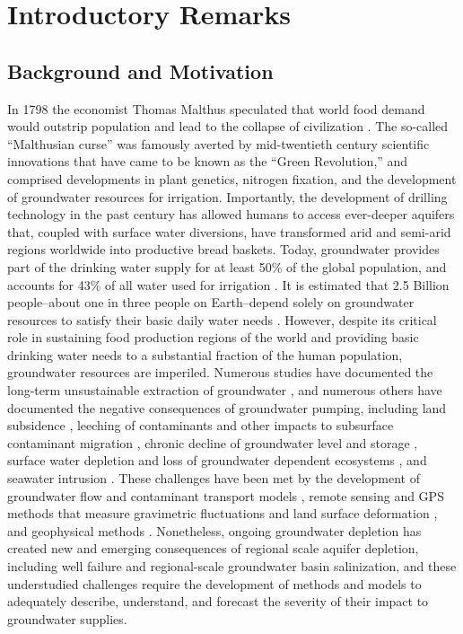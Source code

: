 \chapter[Introductory Remarks.]{Introductory Remarks}

\section{Background and Motivation}

In 1798 the economist Thomas Malthus speculated that world food demand would outstrip population and lead to the collapse of civilization \citep{malthus1992malthus}. The so-called ``Malthusian curse'' was famously averted by mid-twentieth century scientific innovations that have came to be known as the ``Green Revolution,'' and comprised developments in plant genetics, nitrogen fixation, and the development of groundwater resources for irrigation. Importantly, the development of drilling technology in the past century has allowed humans to access ever-deeper aquifers that, coupled with surface water diversions, have transformed arid and semi-arid regions worldwide into productive bread baskets. Today, groundwater provides part of the drinking water supply for at least 50\% of the global population, and accounts for 43\% of all water used for irrigation \citep{siebert2010groundwater}. It is estimated that 2.5 Billion people--about one in three people on Earth--depend solely on groundwater resources to satisfy their basic daily water needs \citep{unesco2015}. However, despite its critical role in sustaining food production regions of the world and providing basic drinking water needs to a substantial fraction of the human population, groundwater resources are imperiled. Numerous studies have documented the long-term unsustainable extraction of groundwater \citep{Famiglietti2014, wada2010global, Doll2012, Gleeson2012, de2019environmental}, and numerous others have documented the negative consequences of groundwater pumping, including land subsidence \citep{Brush2013}, leeching of contaminants and other impacts to subsurface contaminant migration \citep{smith2018overpumping}, chronic decline of groundwater level and storage \citep{Scanlon2012}, surface water depletion and loss of groundwater dependent ecosystems \citep{TNC2014}, and seawater intrusion \citep{bear1999seawater}. These challenges have been met by the development of groundwater flow and contaminant transport models \citep{domenico1998physical, Fetter2001}, remote sensing and GPS methods that measure gravimetric fluctuations \citep{ramillien2008detection} and land surface deformation \citep{galloway1998detection}, and geophysical methods \citep{goebel2019mapping}. Nonetheless, ongoing groundwater depletion has created new and emerging consequences of regional scale aquifer depletion, including well failure and regional-scale groundwater basin salinization, and these understudied challenges require the development of methods and models to adequately describe, understand, and forecast the severity of their impact to groundwater supplies.  

